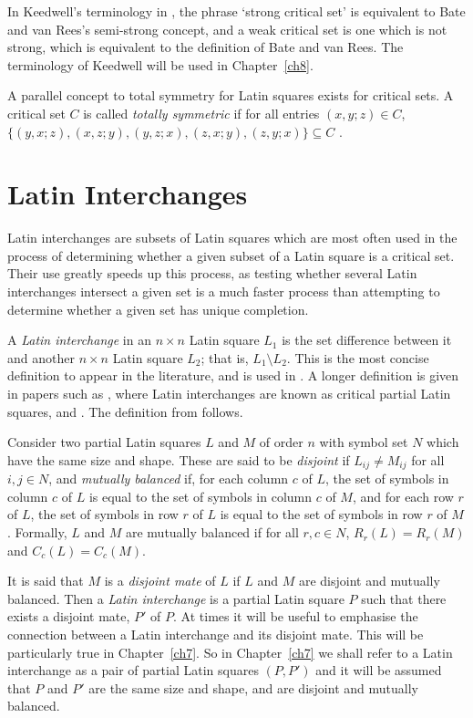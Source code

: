 \documentclass[12pt]{report}
\begin{document}
In Keedwell's terminology in \cite{MR99j:05036}, the phrase `strong
critical set' is equivalent to Bate and van Rees's semi-strong concept,
and a weak critical set is one which is not strong, which is equivalent
to the definition of Bate and van Rees.  The terminology of Keedwell
will be used in Chapter~\ref{ch8}.

A parallel concept to total symmetry for Latin squares exists for critical sets.
A critical set $C$ is called {\it totally symmetric} if
for all entries $(x, y; z) \in C$, \break $\{ (y, x; z), (x, z; y), (y, z; x), 
(z, x; y), (z, y; x) \} \subseteq C$ \cite{pre1}.

\section{Latin Interchanges}
Latin interchanges are subsets of Latin squares which are most often used 
in the process of determining whether a given subset of a Latin square
is a critical set.  Their use greatly speeds up this process, as testing
whether several Latin interchanges intersect a given set is a much faster
process than attempting to determine whether a given set has unique
completion.

A {\it Latin interchange} in an $n \times n$ Latin square $L_{1}$ is the set difference
between it and another $n \times n$ Latin square $L_{2}$; that is, $L_{1} \setminus L_{2}$.
This is the most concise definition to appear in the literature, and is used in \cite{njcint}.
A longer definition is given in papers such as \cite{MR96a:05027},
where Latin interchanges are known as critical partial Latin squares,
and \cite{MR98b:05019}.  The definition from \cite{MR98b:05019} follows.

Consider two partial Latin squares $L$ and $M$ of order $n$ with symbol
set $N$ which have the same size and shape.  These are said to be {\it
disjoint} if $L_{ij} \neq M_{ij}$ for all $i,j \in N$, and {\it mutually
balanced} if, for each column $c$ of $L$, the set of symbols in column $c$
of $L$ is equal to the set of symbols in column $c$ of $M$, and for each
row $r$ of $L$, the set of symbols in row $r$ of $L$ is equal to the
set of symbols in row $r$ of $M$.  Formally, $L$ and $M$ are mutually
balanced if for all $r,c \in N$, $R_r(L) = R_r(M)$ and $C_c(L) = C_c(M)$.

It is said that $M$ is a {\it disjoint mate} of $L$ if $L$ and $M$ are disjoint and 
mutually balanced.
Then a {\it Latin interchange} is a partial Latin square $P$
such that there exists a disjoint mate, $P'$ of $P$.
At times it will be useful to emphasise the connection between a Latin
interchange and its disjoint mate.  This will be particularly true
in Chapter~\ref{ch7}.  So in Chapter~\ref{ch7} we shall refer to a Latin interchange as a pair
of partial Latin squares $(P, P')$ and it will be assumed that $P$
and $P'$ are the same size and shape, and are disjoint and mutually balanced.
\end{document}
